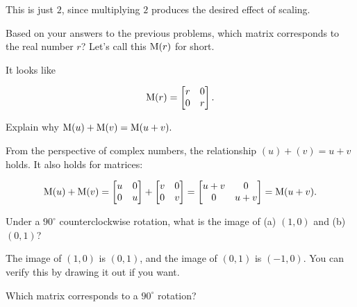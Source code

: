 \documentclass[../key.tex]{subfiles}
\begin{document}
This is just $2$, since multiplying $2$ produces the desired effect of scaling.

\begin{outer_problem}
\item Based on your answers to the previous problems, which matrix corresponds to the real number $r$? Let's call this $\operatorname{M} (r)$ for short.
\end{outer_problem}

It looks like

$$\operatorname{M} (r) = \begin{bmatrix} r & 0 \\ 0 & r \end{bmatrix}.$$

\begin{outer_problem}
\item Explain why $\operatorname{M} (u)+\operatorname{M}(v)=\operatorname{M}(u+v).$
\end{outer_problem}

From the perspective of complex numbers, the relationship $(u)+(v)=u+v$ holds. It also holds for matrices:

$$\operatorname{M}(u) + \operatorname{M}(v) = \begin{bmatrix} u & 0 \\ 0 & u \end{bmatrix} + \begin{bmatrix} v & 0 \\ 0 & v \end{bmatrix} = \begin{bmatrix} u+v & 0 \\ 0 & u+v \end{bmatrix} = \operatorname{M}(u+v).$$

\begin{outer_problem}
\item Under a $90^\circ$ counterclockwise rotation, what is the image of (a) $(1,0)$ and (b) $(0,1)$?
\end{outer_problem}

The image of $(1,0)$ is $(0,1)$, and the image of $(0,1)$ is $(-1,0)$. You can verify this by drawing it out if you want.

\begin{outer_problem}
\item \label{prob:pr_end}
\end{outer_problem}

\begin{inner_problem}[start=1]
\item Which matrix corresponds to a $90^\circ$ rotation?
\end{inner_problem}
\end{document}
